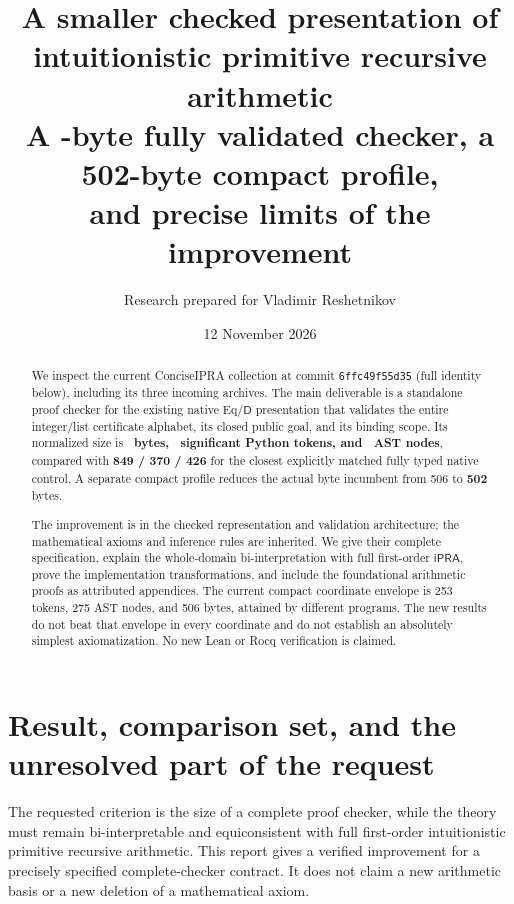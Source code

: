 \documentclass[11pt]{article}
\title{\color{ink}A smaller checked presentation of\\intuitionistic primitive recursive arithmetic\\[0.5em]
\large A \NativeBytes-byte fully validated checker, a 502-byte compact profile,\\and precise limits of the improvement}
\author{Research prepared for Vladimir Reshetnikov}
\date{12 November 2026}
\theoremstyle{definition}\newtheorem{definition}[theorem]{Definition}
\theoremstyle{remark}\newtheorem{remark}[theorem]{Remark}
\newcommand{\D}{\mathsf D}
\newcommand{\ipra}{\mathsf{iPRA}}
\begin{document}
\maketitle
\begin{abstract}
We inspect the current ConciseIPRA collection at commit
\texttt{6ffc49f55d35} (full identity below), including its three incoming
archives. The main deliverable is a standalone proof checker for the existing
native Eq/\(\D\) presentation that validates the entire integer/list certificate
alphabet, its closed public goal, and its binding scope. Its normalized size is
\textbf{\NativeBytes\ bytes, \NativeTokens\ significant Python tokens, and
\NativeAST\ AST nodes}, compared with \textbf{849 / 370 / 426} for the
closest explicitly matched fully typed native control. A separate compact
profile reduces the actual byte incumbent from 506 to \textbf{502} bytes.

The improvement is in the checked representation and validation architecture;
the mathematical axioms and inference rules are inherited. We give their
complete specification, explain the whole-domain bi-interpretation with full
first-order \(\ipra\), prove the implementation transformations, and include
the foundational arithmetic proofs as attributed appendices. The current
compact coordinate envelope is 253 tokens, 275 AST nodes, and 506 bytes,
attained by different programs. The new results do not beat that envelope in
every coordinate and do not establish an absolutely simplest axiomatization.
No new Lean or Rocq verification is claimed.
\end{abstract}

\tableofcontents
\newpage
\section{Result, comparison set, and the unresolved part of the request}
\label{main:result}

The requested criterion is the size of a complete proof checker, while the
theory must remain bi-interpretable and equiconsistent with full first-order
intuitionistic primitive recursive arithmetic. This report gives a verified
improvement for a precisely specified complete-checker contract. It does not
claim a new arithmetic basis or a new deletion of a mathematical axiom.
\end{document}
